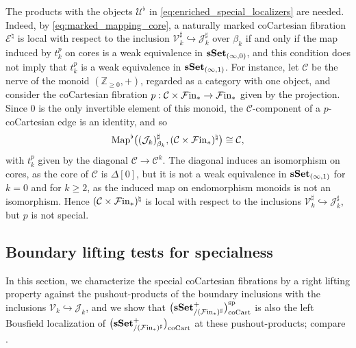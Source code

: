 \documentclass[10pt,reqno]{amsart}
\begin{document}
\begin{rmk}
\label{rem:compat_generator_tensors}
The products with the objects $\mathcal U^\flat$ in
\eqref{eq:enriched_special_localizers} are needed. Indeed, by
\eqref{eq:marked_mapping_core}, a naturally marked coCartesian
fibration $\mathcal E^\natural$ is local with respect to the
inclusion $\mathcal V_k^\sharp\hookrightarrow\mathcal J_k^\sharp$
over $\beta_k$ if and only if the map induced by $t_k^p$ on cores
is a weak equivalence in $\mathbf{sSet}_{(\infty,0)}$, and this condition
does not imply that $t_k^p$ is a weak equivalence in
$\mathbf{sSet}_{(\infty,1)}$. For instance, let $\mathcal C$ be the nerve
of the monoid $(\mathbb Z_{\geq0},+)$, regarded as a category with
one object, and consider the coCartesian fibration
$p:\mathcal C\times\mathcal{F}\mathrm{in}_*\to\mathcal{F}\mathrm{in}_*$ given by the projection. Since
$0$ is the only invertible element of this monoid, the
$\mathcal C$-component of a $p$-coCartesian edge is an identity,
and so
\[
\operatorname{Map}^\flat\bigl((\mathcal J_k)^\sharp_{\beta_k},
                 (\mathcal C\times\mathcal{F}\mathrm{in}_*)^\natural\bigr)
\cong\mathcal C,
\]
with $t_k^p$ given by the diagonal $\mathcal C\to\mathcal C^k$.
The diagonal induces an isomorphism on cores, as the core of
$\mathcal C$ is $\Delta[0]$, but it is not a weak equivalence in
$\mathbf{sSet}_{(\infty,1)}$ for $k=0$ and for $k\geq2$, as the induced
map on endomorphism monoids is not an isomorphism. Hence
$(\mathcal C\times\mathcal{F}\mathrm{in}_*)^\natural$ is local with respect to the
inclusions $\mathcal V_k^\sharp\hookrightarrow\mathcal J_k^\sharp$,
but $p$ is not special.
\end{rmk}

\subsection{Boundary lifting tests for specialness}
\label{subsec:enriched_boundary_tests}

In this section, we characterize the special coCartesian fibrations by
a right lifting property against the pushout-products of the boundary
inclusions with the inclusions
$\mathcal V_k\hookrightarrow\mathcal J_k$, and we show that
$\bigl(\mathbf{sSet}^+_{/(\mathcal{F}\mathrm{in}_*)^\sharp}\bigr)_{\mathrm{coCart}}^{\mathrm{sp}}$ is also the left Bousfield localization of $\bigl(\mathbf{sSet}^+_{/(\mathcal{F}\mathrm{in}_*)^\sharp}\bigr)_{\mathrm{coCart}}$
at these pushout-products; compare
\cite[Theorem~4.46 and its proof]{barwick2010bousfield}.
\end{document}
